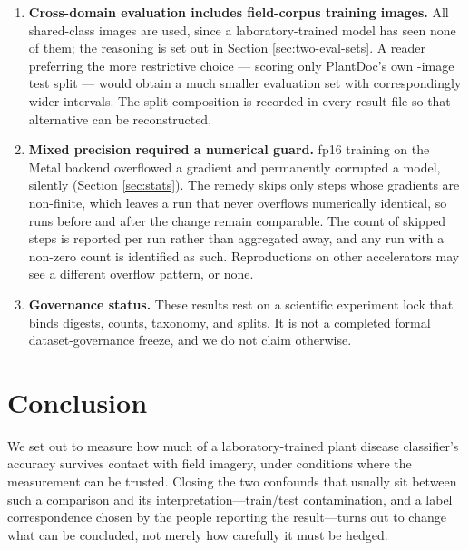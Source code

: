 \documentclass[runningheads]{llncs}
\begin{document}
\begin{enumerate}
\item \textbf{Cross-domain evaluation includes field-corpus training images.}
All \NXdImages{} shared-class images are used, since a laboratory-trained model
has seen none of them; the reasoning is set out in Section
\ref{sec:two-eval-sets}. A reader preferring the more restrictive choice ---
scoring only PlantDoc's own \NPdcTest{}-image test split --- would obtain a
much smaller evaluation set with correspondingly wider intervals. The split
composition is recorded in every result file so that alternative can be
reconstructed.

\item \textbf{Mixed precision required a numerical guard.} fp16 training on the
Metal backend overflowed a gradient and permanently corrupted a model, silently
(Section \ref{sec:stats}). The remedy skips only steps whose gradients are
non-finite, which leaves a run that never overflows numerically identical, so
runs before and after the change remain comparable. The count of skipped steps
is reported per run rather than aggregated away, and any run with a non-zero
count is identified as such. Reproductions on other accelerators may see a
different overflow pattern, or none.

\item \textbf{Governance status.} These results rest on a scientific experiment
lock that binds digests, counts, taxonomy, and splits. It is not a completed
formal dataset-governance freeze, and we do not claim otherwise.
\end{enumerate}

\section{Conclusion}

We set out to measure how much of a laboratory-trained plant disease
classifier's accuracy survives contact with field imagery, under conditions
where the measurement can be trusted. Closing the two confounds that usually sit
between such a comparison and its interpretation---train/test contamination, and
a label correspondence chosen by the people reporting the result---turns out to
change what can be concluded, not merely how carefully it must be hedged.
\end{document}
